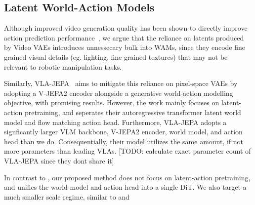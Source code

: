 \subsection{Latent World-Action Models}


Although improved video generation quality has been shown to directly improve action prediction performance~\cite{DreamZero, MimicVideo}, we argue that the reliance on latents produced by Video VAEs introduces unnessecary bulk into WAMs, since they encode fine grained visual details (eg. lighting, fine grained textures) that may not be relevant to robotic manipulation tasks.

Similarly, VLA-JEPA~\cite{VLAJEPA} aims to mitigate this reliance on pixel-space VAEs by adopting a V-JEPA2 encoder alongside a generative world-action modelling objective, with promising results. However, the work mainly focuses on latent-action pretraining, and seperates their autoregressive transformer latent world model and flow matching action head. Furthermore, VLA-JEPA adopts a signficantly larger VLM backbone, V-JEPA2 encoder, world model, and action head than we do. Consequentially, their model utilizes the same amount, if not more parameters than leading VLAs\cite{pi0.5}. [TODO: calculate exact parameter count of VLA-JEPA since they dont share it]

In contrast to \citet{VLAJEPA}, our proposed method does not focus on latent-action pretraining, and unifies the world model and action head into a single DiT. We also target a much smaller scale regime, similar to \citet{SmolVLA} and \citet{TinyVLA}

